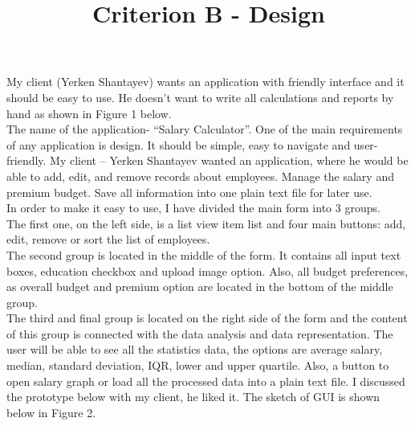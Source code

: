 \documentclass[a4paper]{article}
\title{Criterion B - Design}
\date{}
\begin{document}
\maketitle

My client (Yerken Shantayev) wants an application with friendly interface and it should be easy to use. He doesn’t want to write all calculations and reports by hand as shown in Figure 1 below.\\

The name of the application- “Salary Calculator”. One of the main requirements of any application is design. It should be simple, easy to navigate and user-friendly. My client – Yerken Shantayev wanted an application, where he would be able to add, edit, and remove records about employees. Manage the salary and premium budget. Save all information into one plain text file for later use.\\

In order to make it easy to use, I have divided the main form into 3 groups.\\

The first one, on the left side, is a list view item list and four main buttons: add, edit, remove or sort the list of employees.\\

The second group is located in the middle of the form. It contains all input text boxes, education checkbox and upload image option. Also, all budget preferences, as overall budget and premium option are located in the bottom of the middle group.\\

The third and final group is located on the right side of the form and the content of this group is connected with the data analysis and data representation. The user will be able to see all the statistics data, the options are average salary, median, standard deviation, IQR, lower and upper quartile. Also, a button to open salary graph or load all the processed data into a plain text file. I discussed the prototype below with my client, he liked it. The sketch of GUI is shown below in Figure 2.\\
\end{document}
